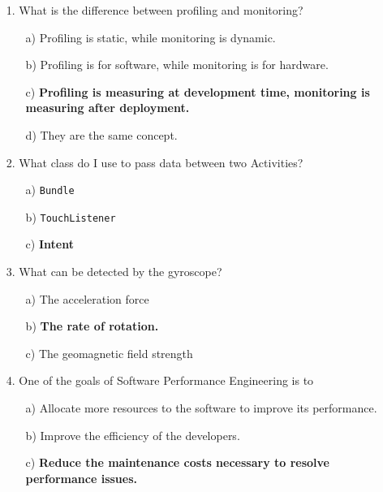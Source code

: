 \documentclass[12pt]{article}
\begin{document}
\begin{itemize}
    \item[1.] What is the difference between profiling and monitoring?
    \begin{itemize}
        \item[a)] Profiling is static, while monitoring is dynamic.
        \item[b)] Profiling is for software, while monitoring is for hardware.
        \item[c)] \textbf{Profiling is measuring at development time, monitoring is measuring after deployment.}
        \item[d)] They are the same concept.
    \end{itemize}

    \item[2.] What class do I use to pass data between two Activities?
    \begin{itemize}
        \item[a)] \texttt{Bundle}
        \item[b)] \texttt{TouchListener}
        \item[c)] \textbf{Intent}
    \end{itemize}

    \item[3.] What can be detected by the gyroscope?
    \begin{itemize}
        \item[a)] The acceleration force
        \item[b)] \textbf{The rate of rotation.}
        \item[c)] The geomagnetic field strength
    \end{itemize}

    \item[4.] One of the goals of Software Performance Engineering is to
    \begin{itemize}
        \item[a)] Allocate more resources to the software to improve its performance.
        \item[b)] Improve the efficiency of the developers.
        \item[c)] \textbf{Reduce the maintenance costs necessary to resolve performance issues.}
    \end{itemize}


\end{itemize}
\end{document}
